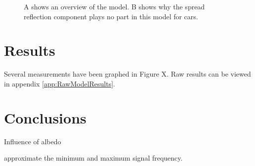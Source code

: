 \begin{figure}
	\centering     %
	\caption{A shows an overview of the model. B shows why the spread reflection component plays no part in this model for cars.}
\end{figure}

\section{Results}
Several measurements have been graphed in Figure X. Raw results can be viewed in appendix \ref{app:RawModelResults}.


\section{Conclusions}

Influence of albedo

approximate the minimum and maximum signal frequency.


